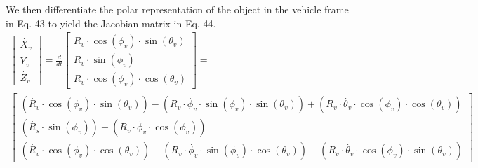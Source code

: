 \documentclass[a4paper]{IEEEtran}
\begin{document}
We then differentiate the polar representation of the object in the vehicle frame in Eq. 43 to yield the Jacobian matrix in Eq. 44. 
\begingroup\makeatletter\def\f@size{7}\check@mathfonts
\begin{gather}
\left[\begin{array}{c}
\dot{X_{v}}\\
\dot{Y_{v}}\\
\dot{Z_{v}}
\end{array}\right]=\frac{d}{dt}\left[\begin{array}{c}
R_{v}\cdot\cos\left(\phi_{v}\right)\cdot\sin\left(\theta_{v}\right)\\
R_{v}\cdot\sin\left(\phi_{v}\right)\\
R_{v}\cdot\cos\left(\phi_{v}\right)\cdot\cos\left(\theta_{v}\right)
\end{array}\right]= \nonumber\\
\left[\begin{array}{c}
\left(\dot{R_{v}}\cdot\cos\left(\phi_{v}\right)\cdot\sin\left(\theta_{v}\right)\right)-\left(R_{v}\cdot\dot{\phi_{v}}\cdot\sin\left(\phi_{v}\right)\cdot\sin\left(\theta_{v}\right)\right)+\left(R_{v}\cdot\dot{\theta_{v}}\cdot\cos\left(\phi_{v}\right)\cdot\cos\left(\theta_{v}\right)\right)\\
\left(\dot{R_{s}}\cdot\sin\left(\phi_{v}\right)\right)+\left(R_{v}\cdot\dot{\phi_{v}}\cdot\cos\left(\phi_{v}\right)\right)\\
\left(\dot{R_{v}}\cdot\cos\left(\phi_{v}\right)\cdot\cos\left(\theta_{v}\right)\right)-\left(R_{v}\cdot\dot{\phi_{v}}\cdot\sin\left(\phi_{v}\right)\cdot\cos\left(\theta_{v}\right)\right)-\left(R_{v}\cdot\dot{\theta_{v}}\cdot\cos\left(\phi_{v}\right)\cdot\sin\left(\theta_{v}\right)\right)
\end{array}\right]
\end{gather}
\endgroup 
\end{document}
